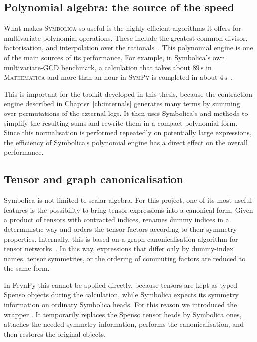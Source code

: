 \subsection*{Polynomial algebra: the source of the speed}

What makes \textsc{Symbolica} so useful is the highly efficient algorithms it offers for multivariate polynomial operations. These include the greatest common divisor, factorisation, and interpolation over the rationals~\cite{symbolica}. This polynomial engine is one of the main sources of its performance. For example, in Symbolica's own multivariate-GCD benchmark, a calculation that takes about $89\,\mathrm{s}$ in \textsc{Mathematica} and more than an hour in \textsc{SymPy} is completed in about $4\,\mathrm{s}$~\cite{symbolica,ruijl_symbolica_talk}.

This is important for the toolkit developed in this thesis, because the contraction engine described in Chapter~\ref{ch:internals} generates many terms by summing over permutations of the external legs. It then uses Symbolica's  and  methods to simplify the resulting sums and rewrite them in a compact polynomial form. Since this normalisation is performed repeatedly on potentially large expressions, the efficiency of Symbolica's polynomial engine has a direct effect on the overall performance.

\subsection*{Tensor and graph canonicalisation}

Symbolica is not limited to scalar algebra. For this project, one of its most useful features is the possibility to bring tensor expressions into a canonical form. Given a product of tensors with contracted indices,  renames dummy indices in a deterministic way and orders the tensor factors according to their symmetry properties. Internally, this is based on a graph-canonicalisation algorithm for tensor networks~\cite{ruijl_symbolica_talk}. In this way, expressions that differ only by dummy-index names, tensor symmetries, or the ordering of commuting factors are reduced to the same form.

In FeynPy this cannot be applied directly, because tensors are kept as typed Spenso objects during the calculation, while Symbolica expects its symmetry information on ordinary Symbolica heads. For this reason we introduced the wrapper . It temporarily replaces the Spenso tensor heads by Symbolica ones, attaches the needed symmetry information, performs the canonicalisation, and then restores the original objects.

